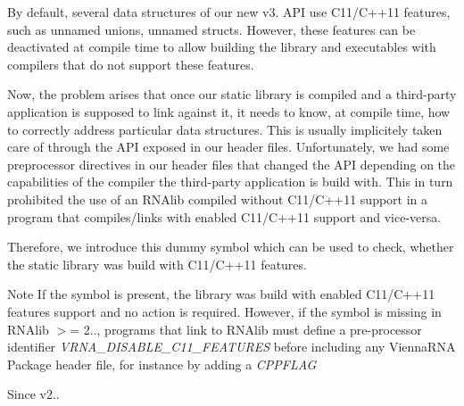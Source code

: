 By default, several data structures of our new v3. A\+PI use C11/\+C++11 features, such as unnamed unions, unnamed structs. However, these features can be deactivated at compile time to allow building the library and executables with compilers that do not support these features.

Now, the problem arises that once our static library is compiled and a third-\/party application is supposed to link against it, it needs to know, at compile time, how to correctly address particular data structures. This is usually implicitely taken care of through the A\+PI exposed in our header files. Unfortunately, we had some preprocessor directives in our header files that changed the A\+PI depending on the capabilities of the compiler the third-\/party application is build with. This in turn prohibited the use of an R\+N\+Alib compiled without C11/\+C++11 support in a program that compiles/links with enabled C11/\+C++11 support and vice-\/versa.

Therefore, we introduce this dummy symbol which can be used to check, whether the static library was build with C11/\+C++11 features.

\begin{DoxyNote}{Note}
If the symbol is present, the library was build with enabled C11/\+C++11 features support and no action is required. However, if the symbol is missing in R\+N\+Alib $>$= 2.., programs that link to R\+N\+Alib must define a pre-\/processor identifier {\itshape V\+R\+N\+A\+\_\+\+D\+I\+S\+A\+B\+L\+E\+\_\+\+C11\+\_\+\+F\+E\+A\+T\+U\+R\+ES} before including any Vienna\+R\+NA Package header file, for instance by adding a {\itshape C\+P\+P\+F\+L\+AG} 
\begin{DoxyCode}{0}
\end{DoxyCode}

\end{DoxyNote}
\begin{DoxySince}{Since}
v2.. 
\end{DoxySince}
